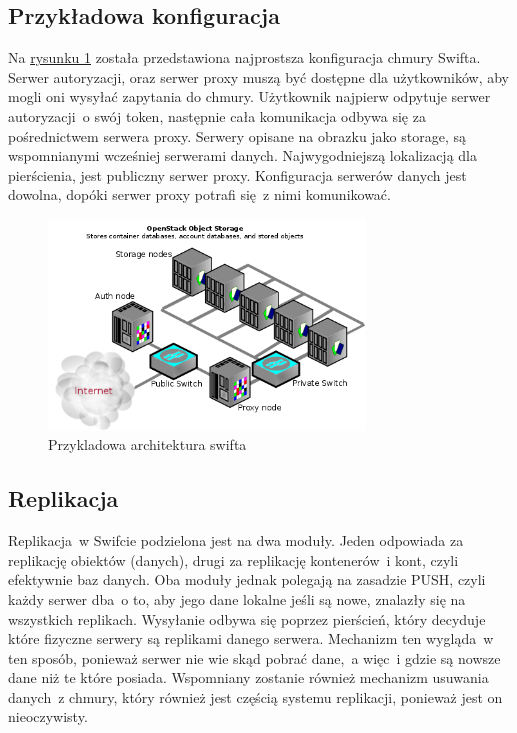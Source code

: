 \subsection{Przykładowa konfiguracja}\label{sub:przykladowa konfiguracja}

Na \hyperref[fig:swift_arch]{rysunku \ref{fig:swift_arch}} została przedstawiona najprostsza konfiguracja chmury Swifta. Serwer autoryzacji, oraz serwer proxy muszą być dostępne dla użytkowników, aby mogli oni wysyłać zapytania do chmury. Użytkownik najpierw odpytuje serwer autoryzacji~o swój token, następnie cała komunikacja odbywa się za pośrednictwem serwera proxy. Serwery opisane na obrazku jako storage, są wspomnianymi wcześniej serwerami danych. Najwygodniejszą lokalizacją dla pierścienia, jest publiczny serwer proxy. Konfiguracja serwerów danych jest dowolna, dopóki serwer proxy potrafi się~z nimi komunikować.

\begin{figure}
\centering
	\includegraphics[width=0.75\textwidth]{swift_install_arch.png}
	\caption{Przykladowa architektura swifta~\cite{swift_manual}}
\label{fig:swift_arch}
\end{figure}


\subsection{Replikacja}\label{sec:replikacja}

Replikacja~w Swifcie podzielona jest na dwa moduły. Jeden odpowiada za replikację obiektów (danych), drugi za replikację kontenerów~i kont, czyli efektywnie baz danych. Oba moduły jednak polegają na zasadzie PUSH, czyli każdy serwer dba~o to, aby jego dane lokalne jeśli są nowe, znalazły się na wszystkich replikach. Wysyłanie odbywa się poprzez pierścień, który decyduje które fizyczne serwery są replikami danego serwera. Mechanizm ten wygląda~w ten sposób, ponieważ serwer nie wie skąd pobrać dane,~a więc~i gdzie są nowsze dane niż te które posiada. Wspomniany zostanie również mechanizm usuwania danych~z chmury, który również jest częścią systemu replikacji, ponieważ jest on nieoczywisty. 

